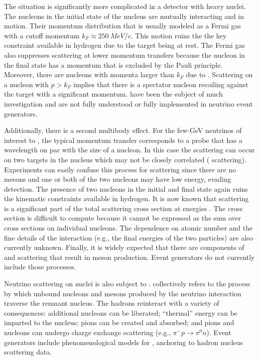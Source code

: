 The situation is significantly more complicated in a detector with heavy nuclei. The nucleons in the initial state of the nucleus are mutually interacting and in motion. Their momentum distribution that is usually modeled as a Fermi gas with a cutoff momentum $k_F \approx 
\SI{250}{MeV/c}$\cite{Smith:1972xh}. This motion ruins the the key constraint available in hydrogen due to the target being at rest. The Fermi gas also suppresses scattering at lower momentum transfers because the nucleon in the final state has a momentum that is excluded by the Pauli principle.  Moreover, there are nucleons with momenta larger than $k_F$ due to  \cite{Bodek:2014jxa}. Scattering on a nucleon with $p>k_F$ implies that there is a spectator nucleon recoiling against the target with a significant momentum.  have been the subject of much investigation and are not fully understood or fully implemented in neutrino event generators.

Additionally, there is a second multibody effect. For the few-GeV neutrinos of interest to , the typical momentum transfer corresponds to a probe that has a wavelength on par with the size of a nucleon. In this case the scattering can occur on two targets in the nucleus which may not be closely correlated ( scattering). Experiments can easily confuse this process for  scattering since there are no mesons and one or both of the two nucleons may have low energy, evading detection. The presence of two nucleons in the initial and final state again ruins the kinematic constraints available in hydrogen. It is now known that  scattering is a significant part of the total scattering cross section at  energies \cite{Ruterbories:2018gub}. The  cross section is difficult to compute because it cannot be expressed as the sum over cross sections on individual nucleons. The dependence on atomic number and the fine details of the interaction (e.g., the final energies of the two particles) are also currently unknown. Finally, it is widely expected that there are components of  and  scattering that result in meson production. Event generators do not currently include those processes.


Neutrino scattering on nuclei is also subject to .  collectively refers to the process by which unbound nucleons and mesons produced by the neutrino interaction traverse the remnant nucleus. The hadrons reinteract with a variety of consequences: additional nucleons can be liberated; ``thermal'' energy can be imparted to the nucleus; pions can be created and absorbed; and pions and nucleons can undergo charge exchange scattering (e.g., $\pi^- p \to \pi^0 n$).  Event generators include phenomenological models for , anchoring to hadron nucleus scattering data.

